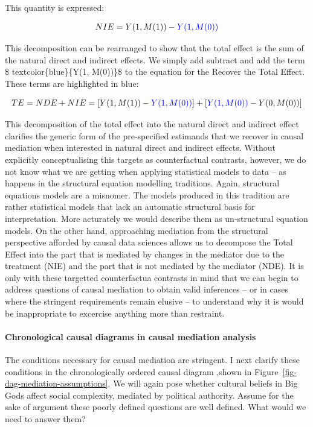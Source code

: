 \documentclass[
  singlecolumn,
  9pt]{article}
\let\oldparagraph\paragraph
\renewcommand{\paragraph}[1]{\oldparagraph{#1}\mbox{}}
\begin{document}
This quantity is expressed:

\[
 NIE = Y(1, M(1)) - \textcolor{blue}{Y(1, M(0))}
 \]

This decomposition can be rearranged to show that the total effect is
the sum of the natural direct and indirect effects. We simply add
subtract and add the term \$ textcolor\{blue\}\{Y(1, M(0))\}\$ to the
equation for the Recover the Total Effect. These terms are highlighted
in blue:

\[
TE = NDE + NIE = [Y(1, M(1)) - \textcolor{blue}{Y(1, M(0))}] + [\textcolor{blue}{Y(1, M(0))} - Y(0, M(0))]
\]

This decomposition of the total effect into the natural direct and
indirect effect clarifies the generic form of the pre-specified
estimands that we recover in causal mediation when interested in natural
direct and indirect effects. Without explicitly conceptualising this
targets as counterfactual contrasts, however, we do not know what we are
getting when applying statistical models to data -- as happens in the
structural equation modelling traditions. Again, structural equations
models are a misnomer. The models produced in this tradition are rather
statistical models that lack an automatic structural basis for
interpretation. More acturately we would describe them as un-structural
equation models. On the other hand, approaching mediation from the
structural perspective afforded by causal data sciences allows us to
decompose the Total Effect into the part that is mediated by changes in
the mediator due to the treatment (NIE) and the part that is not
mediated by the mediator (NDE). It is only with these targetted
counterfactua contrasts in mind that we can begin to address questions
of causal mediation to obtain valid inferences -- or in cases where the
stringent requirements remain elusive -- to understand why it is would
be inappropriate to excercise anything more than restraint.

\paragraph{Chronological causal diagrams in causal mediation
analysis}\label{chronological-causal-diagrams-in-causal-mediation-analysis}

The conditions necessary for causal mediation are stringent. I next
clarify these conditions in the chronologically ordered causal diagram
,shown in Figure~\ref{fig-dag-mediation-assumptions}. We will again pose
whether cultural beliefs in Big Gods affect social complexity, mediated
by political authority. Assume for the sake of argument these poorly
defined questions are well defined. What would we need to answer them?
\end{document}

